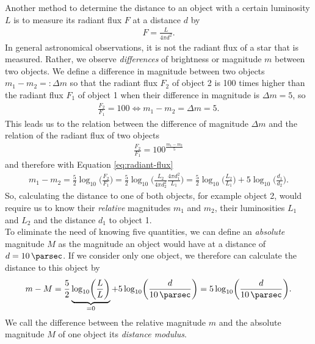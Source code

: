 Another method to determine the distance to an object with a certain luminosity $L$ is to measure its radiant flux $F$ at a distance $d$ by
\begin{align}
    F = \frac{L}{4\pi d^2}. \label{eq:radiant-flux} 
\end{align}
In general astronomical observations, it is not the radiant flux of a star that is measured. Rather, we observe \textit{differences} of brightness or magnitude $m$ between two objects. We define a difference in magnitude between two objects $m_{1} - m_{2} =: \Delta m$ so that the radiant flux $F_{2}$ of object 2 is 100 times higher than the radiant flux $F_{1}$ of object 1 when their difference in magnitude is $\Delta m = 5$, so 
\begin{align}
    \frac{F_{2}}{F_{1}} = 100 \Leftrightarrow m_{1} - m_{2} = \Delta m = 5.
\end{align}
This leads us to the relation between the difference of magnitude $\Delta m$ and the relation of the radiant flux of two objects
\begin{align}
    \frac{F_{2}}{F_{1}} = 100^{\frac{m_{1} - m_{2}}{5}} 
\end{align}
and therefore with Equation \eqref{eq:radiant-flux}
\begin{align}
    m_{1} - m_{2} = \frac{5}{2} \log_{10} \biggl( \frac{F_{2}}{F_{1}} \biggr) = \frac{5}{2} \log_{10} \biggl( \frac{L_{2}}{4\pi d_{2}^2} \frac{4\pi d_{1}^2}{L_{1}} \biggr) = \frac{5}{2} \log_{10} \biggl( \frac{L_{2}}{L_{1}} \biggr) + 5 \log_{10} \biggl( \frac{d_{1}}{d_{2}} \biggr). \label{eq:rel-magnitude-distance-relation} 
\end{align}
So, calculating the distance to one of both objects, for example object 2, would require us to know their \textit{relative} magnitudes $m_{1}$ and $m_{2}$, their luminosities $L_{1}$ and $L_{2}$ and the distance $d_{1}$ to object 1. \\
To eliminate the need of knowing five quantities, we can define an \textit{absolute} magnitude $M$ as the magnitude an object would have at a distance of $d = \SI{10}{\parsec}$. If we consider only one object, we therefore can calculate the distance to this object by
\begin{align}
    m - M = \frac{5}{2} \underbrace{\log_{10} \biggl( \frac{L}{L} \biggr)}_{ = 0} + 5 \log_{10} \biggl( \frac{d}{\SI{10}{\parsec}} \biggr) = 5 \log_{10} \biggl(\frac{d}{\SI{10}{\parsec}}\biggr). \label{eq:distance-modulus} 
\end{align}
We call the difference between the relative magnitude $m$ and the absolute magnitude $M$ of one object its \textit{distance modulus}. \\
